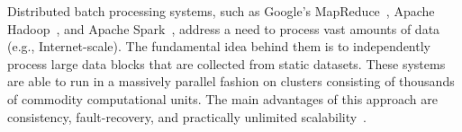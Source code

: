 


Distributed batch processing systems, such as Google's MapReduce~\cite{Dean:2008:MSD:1327452.1327492}, Apache Hadoop~\cite{hadoop2009hadoop}, and Apache Spark~\cite{Zaharia:2016:ASU:3013530.2934664}, address a need to process vast amounts of data (e.g., Internet-scale). The fundamental idea behind them is to independently process large data blocks that are collected from static datasets. These systems are able to run in a massively parallel fashion on clusters consisting of thousands of commodity computational units. The main advantages of this approach are consistency, fault-recovery, and practically unlimited scalability~\cite{borthakur2011apache}.

